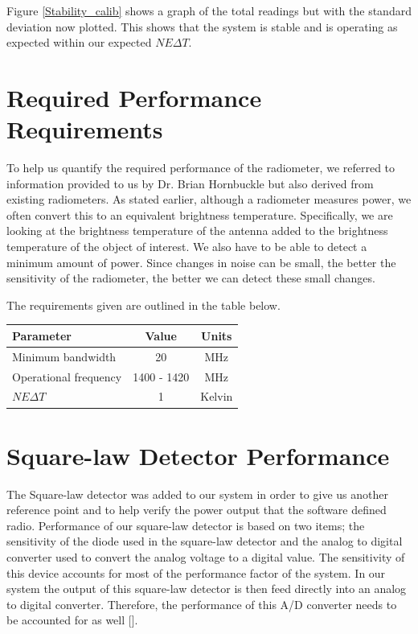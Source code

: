 Figure \ref{Stability_calib} shows a graph of the total readings but with the standard deviation now plotted.  This shows that the system is stable and is operating as expected within our expected $NE\Delta T$.

\section{Required Performance Requirements}

To help us quantify the required performance of the radiometer, we referred to information provided to us by Dr. Brian Hornbuckle but also derived from existing radiometers.  As stated earlier, although a radiometer measures power, we often convert this to an equivalent brightness temperature.  Specifically, we are looking at the brightness temperature of the antenna added to the brightness temperature of the object of interest.  We also have to be able to detect a minimum amount of power.  Since changes in noise can be small, the better the sensitivity of the radiometer, the better we can detect these small changes.  

The requirements given are outlined in the table below.

\begin{table}[h!tb] \centering
{}
\label{rad_performance}
\begin{tabular}{lcc} \hline
\textbf{Parameter} & \textbf{Value} & \textbf{Units} \\ \hline
Minimum bandwidth & 20 & MHz \\
Operational frequency & 1400 - 1420 & MHz \\
$NE\Delta T$ & 1 & Kelvin \\ \hline
\end{tabular}
\end{table}

\section{Square-law Detector Performance}
The Square-law detector was added to our system in order to give us another reference point and to help verify the power output that the software defined radio.  Performance of our square-law detector is based on two items; the sensitivity of the diode used in the square-law detector and the analog to digital converter used to convert the analog voltage to a digital value.  The sensitivity of this device accounts for most of the performance factor of the system.  In our system the output of this square-law detector is then feed directly into an analog to digital converter.  Therefore, the performance of this A/D converter needs to be accounted for as well [\cite{Terlep}].  

